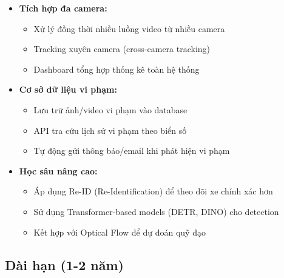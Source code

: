 \begin{itemize}
    \item \textbf{Tích hợp đa camera:}
    \begin{itemize}
        \item Xử lý đồng thời nhiều luồng video từ nhiều camera
        \item Tracking xuyên camera (cross-camera tracking)
        \item Dashboard tổng hợp thống kê toàn hệ thống
    \end{itemize}
    
    \item \textbf{Cơ sở dữ liệu vi phạm:}
    \begin{itemize}
        \item Lưu trữ ảnh/video vi phạm vào database
        \item API tra cứu lịch sử vi phạm theo biển số
        \item Tự động gửi thông báo/email khi phát hiện vi phạm
    \end{itemize}
    
    \item \textbf{Học sâu nâng cao:}
    \begin{itemize}
        \item Áp dụng Re-ID (Re-Identification) để theo dõi xe chính xác hơn
        \item Sử dụng Transformer-based models (DETR, DINO) cho detection
        \item Kết hợp với Optical Flow để dự đoán quỹ đạo
    \end{itemize}
\end{itemize}

\subsection{Dài hạn (1-2 năm)}

